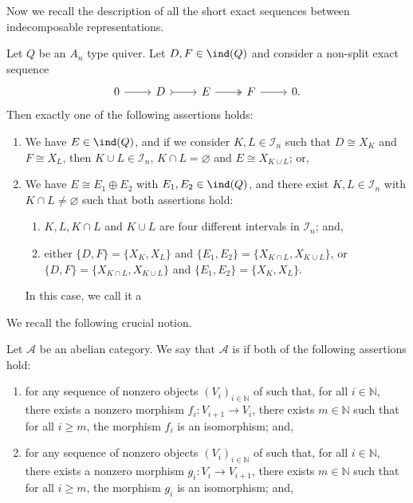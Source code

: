     Now we recall the description of all the short exact sequences between indecomposable representations.

    \begin{theorem} \label{thm:exttypeA} Let $Q$ be an $A_n$ type quiver. Let $D,F \in \ind(Q)$ and consider a non-split exact sequence \[\begin{tikzcd}
	0 & D & E & F &  0.
	\arrow[from=1-1, to=1-2]
	\arrow[tail, from=1-2, to=1-3]
	\arrow[two heads,from=1-3, to=1-4]
	\arrow[from=1-4, to=1-5]
\end{tikzcd} \]
      Then exactly one of the following assertions holds:
      \begin{enumerate}[label=$(\alph*)$,itemsep=1mm]
          \item We have $E \in \ind(Q)$, and if we consider $K,L \in \mathcal{I}_n$ such that $D \cong X_K$ and $F \cong X_L$, then $K \cup L \in \mathcal{I}_n$, $K \cap L = \varnothing$ and $E \cong X_{K \cup L}$; or,
          \item We have $E \cong E_1 \oplus E_2$ with $E_1,E_2 \in \ind(Q)$, and there exist $K,L \in \mathcal{I}_n$ with $K \cap L \neq \varnothing$ such that both assertions hold:
          \begin{enumerate}[label=$\bullet$,itemsep=1mm]
          \item $K,L,K \cap L$ and $K \cup L$ are four different intervals in $\mathcal{I}_n$; and,
          \item either $\{D,F\} = \{X_K, X_L\}$ and $\{E_1,E_2\} = \{X_{K\cap L}, X_{K \cup L} \}$, or \\
          $\{D,F\} = \{X_{K \cap L}, X_{K \cup L}\}$ and $\{E_1,E_2\} = \{X_{K}, X_{L} \}$.
          \end{enumerate}
          In this case, we call it a  
      \end{enumerate}
    
    \end{theorem}
    
We recall the following crucial notion.

\begin{definition} \label{def:directing}
    Let $\mathscr{A}$ be an abelian category. We say that $\mathscr{A}$ is  if both of the following assertions hold:
    \begin{enumerate}[label=$\bullet$, itemsep=1mm]
        \item for any sequence of nonzero objects $(V_i)_{i \in \mathbb{N}}$ of such that, for all $i \in \mathbb{N}$, there exists a nonzero morphism $f_i : V_{i+1} \longrightarrow V_{i}$, there exists $m \in \mathbb{N}$ such that for all $i \geqslant m$, the morphism $f_i$ is an isomorphism; and,
        \item for any sequence of nonzero objects $(V_i)_{i \in \mathbb{N}}$ of such that, for all $i \in \mathbb{N}$, there exists a nonzero morphism $g_i : V_{i} \longrightarrow V_{i+1}$, there exists $m \in \mathbb{N}$ such that for all $i \geqslant m$, the morphism $g_i$ is an isomorphism; and,
    \end{enumerate}
\end{definition}

